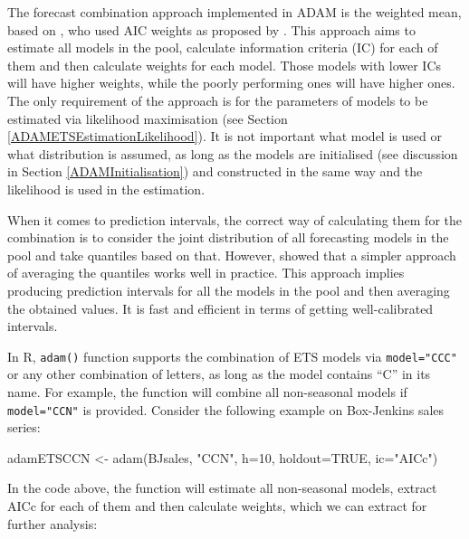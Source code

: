 \documentclass[
]{book}
\newenvironment{Shaded}{\begin{snugshade}}{\end{snugshade}}
\newcommand{\AttributeTok}[1]{\textcolor[rgb]{0.77,0.63,0.00}{#1}}
\newcommand{\ConstantTok}[1]{\textcolor[rgb]{0.00,0.00,0.00}{#1}}
\newcommand{\DecValTok}[1]{\textcolor[rgb]{0.00,0.00,0.81}{#1}}
\newcommand{\FunctionTok}[1]{\textcolor[rgb]{0.00,0.00,0.00}{#1}}
\newcommand{\NormalTok}[1]{#1}
\newcommand{\OtherTok}[1]{\textcolor[rgb]{0.56,0.35,0.01}{#1}}
\newcommand{\StringTok}[1]{\textcolor[rgb]{0.31,0.60,0.02}{#1}}
\theoremstyle{definition}
\theoremstyle{definition}
\theoremstyle{definition}
\theoremstyle{definition}
\theoremstyle{remark}
\begin{document}
The forecast combination approach implemented in ADAM is the weighted mean, based on \citet{Kolassa2011}, who used AIC weights as proposed by \citet{Burnham2004}. This approach aims to estimate all models in the pool, calculate information criteria (IC) for each of them \citep[see discussion in Section 13.4 in][]{SvetunkovSBA} and then calculate weights for each model. Those models with lower ICs will have higher weights, while the poorly performing ones will have higher ones. The only requirement of the approach is for the parameters of models to be estimated via likelihood maximisation (see Section \ref{ADAMETSEstimationLikelihood}). It is not important what model is used or what distribution is assumed, as long as the models are initialised (see discussion in Section \ref{ADAMInitialisation}) and constructed in the same way and the likelihood is used in the estimation.

When it comes to prediction intervals, the correct way of calculating them for the combination is to consider the joint distribution of all forecasting models in the pool and take quantiles based on that. However, \citet{Lichtendahl2013} showed that a simpler approach of averaging the quantiles works well in practice. This approach implies producing prediction intervals for all the models in the pool and then averaging the obtained values. It is fast and efficient in terms of getting well-calibrated intervals.

In R, \texttt{adam()} function supports the combination of ETS models via \texttt{model="CCC"} or any other combination of letters, as long as the model contains ``C'' in its name. For example, the function will combine all non-seasonal models if \texttt{model="CCN"} is provided. Consider the following example on Box-Jenkins sales series:

\begin{Shaded}
\begin{Highlighting}[]
\NormalTok{adamETSCCN }\OtherTok{\textless{}{-}} \FunctionTok{adam}\NormalTok{(BJsales, }\StringTok{"CCN"}\NormalTok{, }\AttributeTok{h=}\DecValTok{10}\NormalTok{, }\AttributeTok{holdout=}\ConstantTok{TRUE}\NormalTok{, }\AttributeTok{ic=}\StringTok{"AICc"}\NormalTok{)}
\end{Highlighting}
\end{Shaded}

In the code above, the function will estimate all non-seasonal models, extract AICc for each of them and then calculate weights, which we can extract for further analysis:
\end{document}

